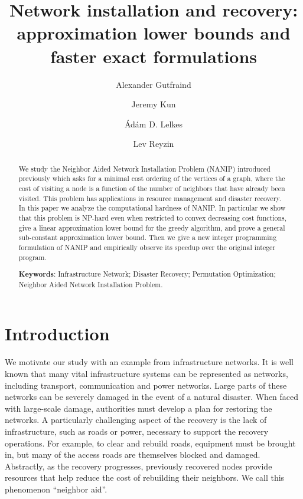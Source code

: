 \documentclass[english]{llncs}
\begin{document}
\title{Network installation and recovery: approximation lower bounds and faster exact formulations}
\date{}

\author{Alexander Gutfraind \and
Jeremy Kun \and
\'Ad\'am D. Lelkes \and
Lev Reyzin}  


\maketitle
 
 
\begin{abstract}
We study the Neighbor Aided Network Installation Problem (NANIP) introduced
previously which asks for a minimal cost ordering of the vertices of
a graph, where the cost of visiting a node is a function of the number of
neighbors that have already been visited. This problem has applications in
resource management and disaster recovery. In this paper we analyze the
computational hardness of NANIP. In particular we show that this problem is
NP-hard even when restricted to convex decreasing cost functions, give a
linear approximation lower bound for the greedy algorithm, and prove a  
general sub-constant approximation lower bound. Then we give a new
integer programming formulation of NANIP and empirically observe its speedup
over the original integer program.

\noindent
\textbf{Keywords}: Infrastructure Network; Disaster Recovery; Permutation
Optimization; Neighbor Aided Network Installation Problem.  
\end{abstract}

\section{Introduction}
\setcounter{footnote}{3} 

We motivate our study with an example from infrastructure networks.  It is
well known that many vital infrastructure systems can be represented as
networks, including transport, communication and power networks.  Large parts
of these networks can be severely damaged in the event of a natural disaster.
When faced with large-scale damage, authorities must develop a plan for
restoring the networks. A particularly challenging aspect of the recovery is
the lack of infrastructure, such as roads or power, necessary to support the
recovery operations.  For example, to clear and rebuild roads, equipment must
be brought in, but many of the access roads are themselves blocked and damaged.
Abstractly, as the recovery progresses, previously recovered nodes provide
resources that help reduce the cost of rebuilding their neighbors. We call this
phenomenon ``neighbor aid''.
\end{document}

